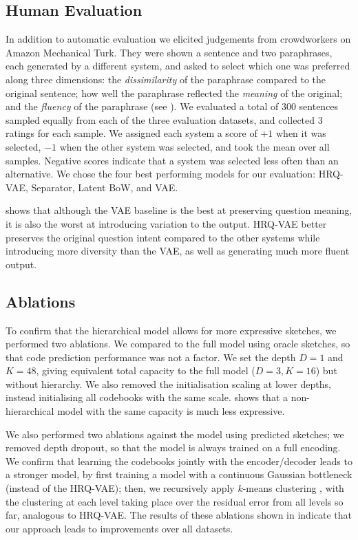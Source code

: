 \documentclass[11pt]{article}
\begin{document}
\subsection{Human Evaluation}

In addition to automatic evaluation we elicited judgements from
crowdworkers on Amazon Mechanical Turk. They were shown
a sentence and two paraphrases, each generated by a different system, and asked to select which one was preferred along three
dimensions: the \textit{dissimilarity} of the paraphrase compared to
the original sentence; how well the paraphrase reflected the
\textit{meaning} of the original; and the \textit{fluency} of the
paraphrase (see ). We evaluated a total of 300
sentences sampled equally from each of the three evaluation datasets, and collected 3
ratings for each sample. We assigned each system a score of $+1$ when
it was selected, $-1$ when the other system was selected, and took the
mean over all samples. Negative scores indicate that a system was
selected less often than an alternative. We chose the four best
performing models for our evaluation:
HRQ-VAE, Separator, Latent BoW, and VAE.


 shows that although the VAE baseline is the best
at preserving question meaning, it is also the worst at introducing
variation to the output. HRQ-VAE better preserves the original
question intent compared to the other systems while introducing more diversity than the VAE, as well as generating much more fluent
output.


\subsection{Ablations}

To confirm that the hierarchical model allows for more expressive sketches, we performed two ablations. We compared to the full model using oracle sketches, so that code prediction performance was not a factor. We set the depth $D=1$ and $K=48$, giving equivalent total capacity to the full model ($D=3,K=16$) but without hierarchy. We also removed the initialisation scaling at lower depths, instead initialising all codebooks with the same scale.  shows that a non-hierarchical model with the same capacity is much less expressive.


We also performed two ablations against the model using predicted sketches; we removed depth dropout, so that the model is always trained on a full encoding. We confirm that learning the codebooks jointly with the encoder/decoder leads to a stronger model, by first training a model with a continuous Gaussian bottleneck (instead of the HRQ-VAE); then, we recursively apply $k$-means clustering \cite{kmeans}, with the clustering at each level taking place over the residual error from all levels so far, analogous to HRQ-VAE. The results of these ablations shown in  indicate that our approach leads to improvements over all datasets.
\end{document}
